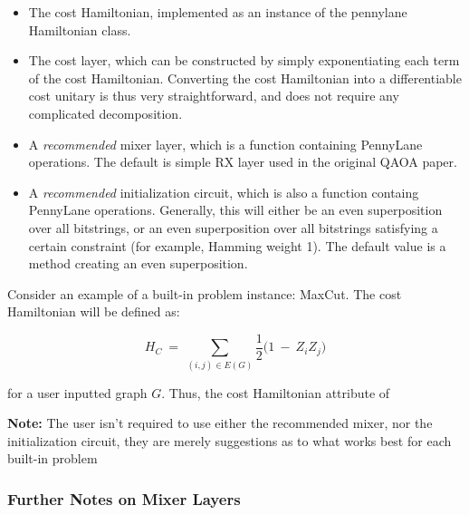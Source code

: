 \documentclass{article}
\begin{document}
   \begin{itemize}

	   \item The cost Hamiltonian, implemented as an instance of the pennylane Hamiltonian
		  class.
	   \item The cost layer, which can be constructed by simply exponentiating each term of the cost 
		   Hamiltonian. Converting the cost Hamiltonian into a differentiable cost unitary is thus 
		   very straightforward, and does not require any complicated decomposition.
	   \item A \textit{recommended} mixer layer, which is a function containing
                 PennyLane operations. The default is simple RX layer used in the original QAOA paper.
	   \item A \textit{recommended} initialization circuit, which is also a function 
                 containg PennyLane operations. Generally, this will either be an 
   		 even superposition over all bitstrings, or an even superposition over all 
   		 bitstrings satisfying a certain constraint (for example, Hamming weight 1).
   		 The default value is a method creating an even superposition.
   \end{itemize}

\noindent
Consider an example of a built-in problem instance: MaxCut. The cost Hamiltonian will be defined as:

\begin{equation}
	H_C \ = \ \displaystyle\sum_{(i, j) \in E(G)} \frac{1}{2} \big(1 \ - \ Z_i Z_j \big)
\end{equation}

for a user inputted graph $G$. Thus, the cost Hamiltonian attribute of 


\noindent
\textbf{Note:} The user isn't required to use either the recommended mixer, nor the
initialization circuit, they are merely suggestions as to what works best 
for each built-in problem

\subsubsection{Further Notes on Mixer Layers}
\end{document}
